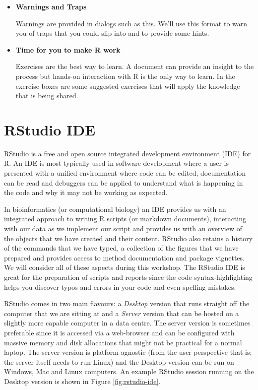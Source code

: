 \documentclass[a4paper]{book}
\newenvironment{rmdblock}[1]
  {\vspace{1.5em}\begin{shaded*}
  \begin{itemize}
  \renewcommand{\labelitemi}{
    \raisebox{-.7\height}[0pt][0pt]{
      {\setkeys{Gin}{width=3em,keepaspectratio}\texttt{[image: images/\#1]}}
    }
  }
  \item
  }
  {
  \end{itemize}
  \end{shaded*}
  }
\newenvironment{rmdcaution}
  {\begin{rmdblock}{caution}}
  {\end{rmdblock}}
\newenvironment{rmdexercise}
  {\begin{rmdblock}{exercise}}
  {\end{rmdblock}}
\begin{document}
\begin{rmdcaution}
\textbf{Warnings and Traps}

Warnings are provided in dialogs such as this. We'll use this format to
warn you of traps that you could slip into and to provide some hints.
\end{rmdcaution}

\begin{rmdexercise}
\textbf{Time for you to make R work}

Exercises are the best way to learn. A document can provide an insight
to the process but hands-on interaction with R is the only way to learn.
In the exercise boxes are some suggested exercises that will apply the
knowledge that is being shared.
\end{rmdexercise}

\section{RStudio IDE}\label{rstudio-ide}

RStudio is a free and open source integrated development environment
(IDE) for R. An IDE is most typically used in software development where
a user is presented with a unified environment where code can be edited,
documentation can be read and debuggers can be applied to understand
what is happening in the code and why it may not be working as expected.

In bioinformatics (or computational biology) an IDE provides us with an
integrated approach to writing R scripts (or markdown documents),
interacting with our data as we implement our script and provides us
with an overview of the objects that we have created and their content.
RStudio also retains a history of the commands that we have typed, a
collection of the figures that we have prepared and provides access to
method documentation and package vignettes. We will consider all of
these aspects during this workshop. The RStudio IDE is great for the
preparation of scripts and reports since the code syntax-highlighting
helps you discover typos and errors in your code and even spelling
mistakes.

RStudio comes in two main flavours: a \emph{Desktop} version that runs
straight off the computer that we are sitting at and a \emph{Server}
version that can be hosted on a slightly more capable computer in a data
centre. The server version is sometimes preferable since it is accessed
via a web-browser and can be configured with massive memory and disk
allocations that might not be practical for a normal laptop. The server
version is platform-agnostic (from the user perspective that is; the
server itself needs to run Linux) and the Desktop version can be run on
Windows, Mac and Linux computers. An example RStudio session running on
the Desktop version is shown in Figure \ref{fig:rstudio-ide}.
\end{document}
